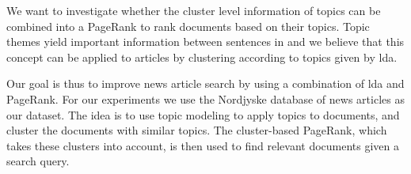 We want to investigate whether the cluster level information of topics can be combined into a PageRank to rank documents based on their topics.
Topic themes yield important information between sentences in \cite{ClusterPageRank} and we believe that this concept can be applied to articles by clustering according to topics given by \gls{lda}.

Our goal is thus to improve news article search by using a combination of \gls{lda} and PageRank.
For our experiments we use the Nordjyske database of news articles as our dataset.
The idea is to use topic modeling to apply topics to documents, and cluster the documents with similar topics.
The cluster-based PageRank, which takes these clusters into account, is then used to find relevant documents given a search query.




